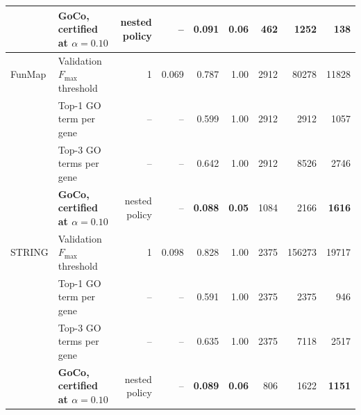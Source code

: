 \begin{table}[htbp]
{\begin{tabular}{l l r r r r r r r}
& \textbf{GoCo, certified at $\alpha=0.10$} & nested policy & -- & \textbf{0.091} & \textbf{0.06} & 462 & 1252 & \textbf{138} \\
\midrule
FunMap & Validation $F_{\max}$ threshold & 1 & 0.069 & 0.787 & 1.00 & 2912 & 80278 & 11828 \\
 & Top-1 GO term per gene & -- & -- & 0.599 & 1.00 & 2912 & 2912 & 1057 \\
 & Top-3 GO terms per gene & -- & -- & 0.642 & 1.00 & 2912 & 8526 & 2746 \\
& \textbf{GoCo, certified at $\alpha=0.10$} & nested policy & -- & \textbf{0.088} & \textbf{0.05} & 1084 & 2166 & \textbf{1616} \\
\midrule
STRING & Validation $F_{\max}$ threshold & 1 & 0.098 & 0.828 & 1.00 & 2375 & 156273 & 19717 \\
 & Top-1 GO term per gene & -- & -- & 0.591 & 1.00 & 2375 & 2375 & 946 \\
 & Top-3 GO terms per gene & -- & -- & 0.635 & 1.00 & 2375 & 7118 & 2517 \\
& \textbf{GoCo, certified at $\alpha=0.10$} & nested policy & -- & \textbf{0.089} & \textbf{0.06} & 806 & 1622 & \textbf{1151} \\
\bottomrule
\end{tabular}}
\end{table}

